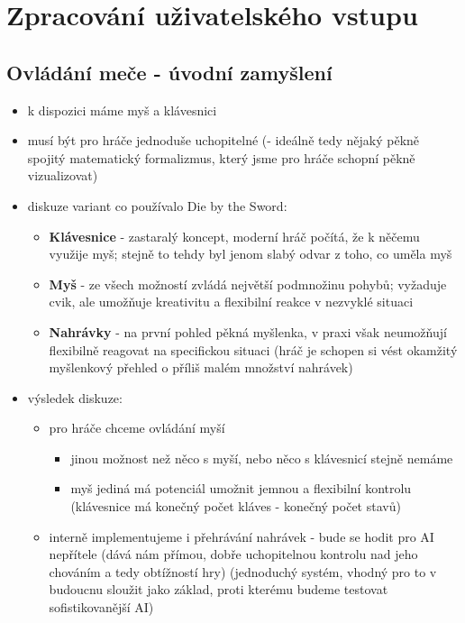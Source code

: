 \section{Zpracování uživatelského vstupu}

\subsection{Ovládání meče - úvodní zamyšlení}
\begin{itemize}
    \item k dispozici máme myš a klávesnici
    \item musí být pro hráče jednoduše uchopitelné (- ideálně tedy nějaký pěkně spojitý matematický formalizmus, který jsme pro hráče schopní pěkně vizualizovat)
    \item diskuze variant co používalo Die by the Sword:
        \begin{itemize}
            \item \textbf{Klávesnice} - zastaralý koncept, moderní hráč počítá, že k něčemu využije myš; stejně to tehdy byl jenom slabý odvar z toho, co uměla myš
            \item \textbf{Myš} - ze všech možností zvládá největší podmnožinu pohybů; vyžaduje cvik, ale umožňuje kreativitu a flexibilní reakce v nezvyklé situaci
            \item \textbf{Nahrávky} - na první pohled pěkná myšlenka, v praxi však neumožňují flexibilně reagovat na specifickou situaci (hráč je schopen si vést okamžitý myšlenkový přehled o příliš malém množství nahrávek)
        \end{itemize}
    \item výsledek diskuze:
        \begin{itemize}
            \item pro hráče chceme ovládání myší
            \begin{itemize}
                \item jinou možnost než něco s myší, nebo něco s klávesnicí stejně nemáme
                \item myš jediná má potenciál umožnit jemnou a flexibilní kontrolu (klávesnice má konečný počet kláves - konečný počet stavů)
            \end{itemize}
            \item interně implementujeme i přehrávání nahrávek - bude se hodit pro AI nepřítele (dává nám přímou, dobře uchopitelnou kontrolu nad jeho chováním a tedy obtížností hry) (jednoduchý systém, vhodný pro to v budoucnu sloužit jako základ, proti kterému budeme testovat sofistikovanější AI)

\end{itemize}
\end{itemize}
